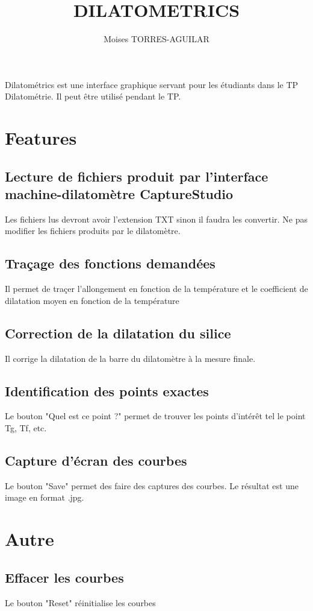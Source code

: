 \documentclass[11pt]{article}
\author{\small Moises TORRES-AGUILAR}
\date{}
\title{\Huge DILATOMETRICS}
\begin{document}
\maketitle
\setlength\parindent{0pt}

Dilatométrics est une interface graphique servant pour  les étudiants dans le TP Dilatométrie. Il peut être utilisé pendant le TP.

\section{Features}
\label{sec-1}
\subsection*{Lecture de fichiers produit par l'interface machine-dilatomètre CaptureStudio}
\label{sec-1-1}
Les fichiers lus devront avoir l'extension TXT sinon il faudra les convertir. Ne pas modifier les fichiers produits par le dilatomètre.
\subsection*{Traçage des fonctions demandées}
\label{sec-1-2}
Il permet de traçer l'allongement en fonction de la température et le coefficient de dilatation moyen en fonction de la température
\subsection*{Correction de la dilatation du silice}
\label{sec-1-3}
Il corrige la dilatation de la barre du dilatomètre à la mesure finale.
\subsection*{Identification des points exactes}
\label{sec-1-4}
Le bouton "Quel est ce point ?" permet de trouver les points d'intérêt tel le point Tg, Tf, etc.
\subsection*{Capture d'écran des courbes}
\label{sec-1-5}
Le bouton "Save" permet des faire des captures des courbes. Le résultat est une image en format .jpg.

\section{Autre}
\label{sec-2}
\subsection*{Effacer les courbes}
\label{sec-2-1}
Le bouton "Reset" réinitialise les courbes
\end{document}
